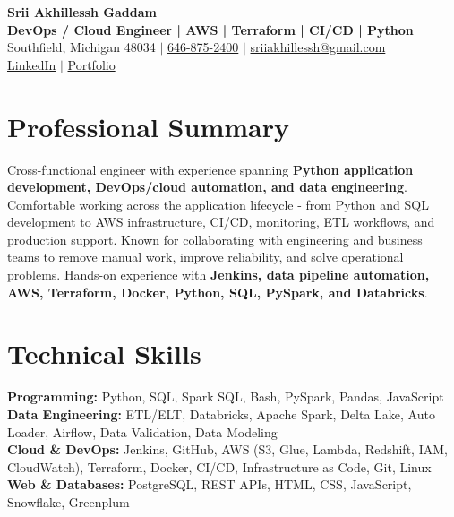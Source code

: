 \documentclass[letterpaper,10pt]{article}
\begin{document}
\fontsize{9.35pt}{10.45pt}\selectfont

\begin{center}
    {\LARGE \textbf{Srii Akhillessh Gaddam}} \\[-1pt]
    \textbf{DevOps / Cloud Engineer | AWS | Terraform | CI/CD | Python} \\[2pt]
    Southfield, Michigan 48034 $|$
    \href{tel:6468752400}{646-875-2400} $|$
    \href{mailto:sriiakhillessh@gmail.com}{sriiakhillessh@gmail.com} \\[1pt]
    \href{https://www.linkedin.com/in/srii-akhiilessh-gaddam-b48668191/}{LinkedIn} $|$
    \href{https://sriiakhillesshg.github.io/portfolio/}{Portfolio}
\end{center}
\vspace{-8pt}

\section{Professional Summary}
\small{Cross-functional engineer with experience spanning \textbf{Python application development, DevOps/cloud automation, and data engineering}. Comfortable working across the application lifecycle - from Python and SQL development to AWS infrastructure, CI/CD, monitoring, ETL workflows, and production support. Known for collaborating with engineering and business teams to remove manual work, improve reliability, and solve operational problems. Hands-on experience with \textbf{Jenkins, data pipeline automation, AWS, Terraform, Docker, Python, SQL, PySpark, and Databricks}.}

\section{Technical Skills}
\small{
\textbf{Programming:} Python, SQL, Spark SQL, Bash, PySpark, Pandas, JavaScript \\
\textbf{Data Engineering:} ETL/ELT, Databricks, Apache Spark, Delta Lake, Auto Loader, Airflow, Data Validation, Data Modeling \\
\textbf{Cloud \& DevOps:} Jenkins, GitHub, AWS (S3, Glue, Lambda, Redshift, IAM, CloudWatch), Terraform, Docker, CI/CD, Infrastructure as Code, Git, Linux \\
\textbf{Web \& Databases:} PostgreSQL, REST APIs, HTML, CSS, JavaScript, Snowflake, Greenplum
}
\end{document}
